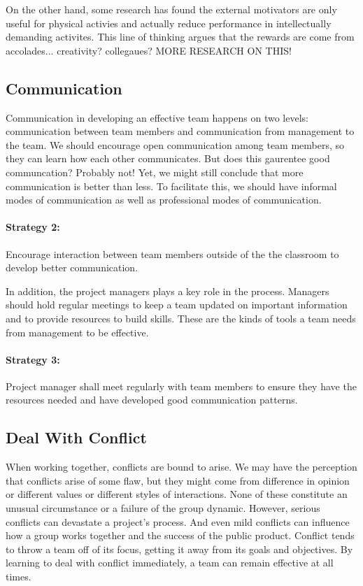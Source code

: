 \documentclass{article}\usepackage[]{graphicx}\usepackage[]{color}
\begin{document}
On the other hand, some research has found the external motivators are only useful for physical activies and actually reduce performance in intellectually demanding activites. This line of thinking argues that the rewards are come from accolades... creativity? collegaues? MORE RESEARCH ON THIS!

\subsection{Communication}
Communication in developing an effective team happens on two levels: communication between team members and communication from management to the team. We should encourage open communication among team members, so they can learn how each other communicates. But does this gaurentee good communcation? Probably not!  Yet, we might still conclude that more communication is better than less. To facilitate this, we should have informal modes of communication as well as professional modes of communication. 

\paragraph{Strategy 2:} Encourage interaction between team members outside of the the classroom to develop better communication. 

In addition, the project managers plays a key role in the process. Managers should hold regular meetings to keep a team updated on important information and to provide resources to build skills. These are the kinds of tools a team needs from management to be effective. 

\paragraph{Strategy 3:} Project manager shall meet regularly with team members to ensure they have the resources needed and have developed good communication patterns.

\subsection{Deal With Conflict}

When working together, conflicts are bound to arise. We may have the perception that conflicts arise of some flaw, but they might come from difference in opinion or different values or different styles of interactions. None of these constitute an unusual circumstance or a failure of the group dynamic. However, serious conflicts can devastate a project's process. And even mild conflicts can influence how a group works together and the success of the public product. Conflict tends to throw a team off of its focus, getting it away from its goals and objectives. By learning to deal with conflict immediately, a team can remain effective at all times.
\end{document}
